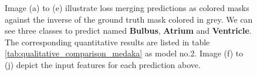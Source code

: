 \begin{figure}[H]
  \caption[Quantitative loss merging analysis for the \ac{MFD}]{Image (a) to (e) illustrate loss merging predictions as colored masks against the inverse of the ground truth mask colored in grey. We can see three classes to predict named \textbf{\textcolor{rwuvioletlight}{Bulbus}}, \textbf{\textcolor{rwucyan40}{Atrium}} and \textbf{\textcolor{rwucyan}{Ventricle}}. The corresponding quantitative results are listed in table \ref{tab:qualitative_comparison_medaka} as model no.2. Image (f) to (j) depict the input features for each prediction above.}
  \label{hlfl_medaka_lossCombo}
\end{figure}

